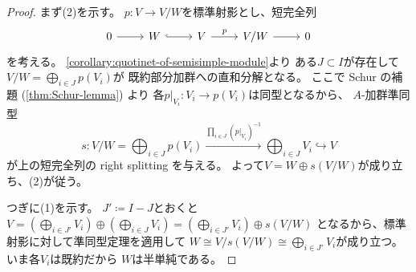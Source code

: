 \documentclass[report]{jlreq}
\begin{document}
\begin{proof}
    まず(2)を示す。
    $p \colon V \to V / W$を標準射影とし、短完全列
    \begin{equation}
        \begin{tikzcd}
            0
                \ar{r}
                & W
                    \ar[hook]{r}
                & V
                    \ar{r}{p}
                & V / W
                    \ar{r}
                & 0
        \end{tikzcd}
    \end{equation}
    を考える。
    \cref{corollary:quotinet-of-semisimple-module}より
    ある$J \subset I$が存在して
    $V / W = \bigoplus_{i \in J} p(V_i)$が
    既約部分加群への直和分解となる。
    ここで Schur の補題 (\cref{thm:Schur-lemma}) より
    各$p|_{V_i} \colon V_i \to p(V_i)$は同型となるから、
    $A$-加群準同型
    \begin{equation}
        s \colon
            V / W = \bigoplus_{i \in J} p(V_i)
            \overset{\prod_{i \in J} (p|_{V_i})^{-1}}{\to}
            \bigoplus_{i \in J} V_i
            \hookrightarrow
            V
    \end{equation}
    が上の短完全列の right splitting を与える。
    よって$V = W \oplus s(V / W)$が成り立ち、(2)が従う。

    つぎに(1)を示す。
    $J' \coloneqq I - J$とおくと
    $V
        = \left(
            \bigoplus_{i \in J'} V_i
        \right)
            \oplus \left( \bigoplus_{i \in J} V_i \right)
        = \left(
            \bigoplus_{i \in J'} V_i
        \right) \oplus s(V / W)$
    となるから、標準射影に対して準同型定理を適用して
    $W \cong V / s(V / W) \cong \bigoplus_{i \in J'} V_i$が成り立つ。
    いま各$V_i$は既約だから
    $W$は半単純である。
\end{proof}

\end{document}
